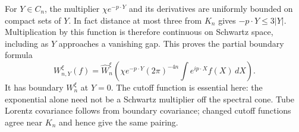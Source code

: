For $Y\in C_n$, the multiplier $\chi e^{-p\cdot Y}$ and its derivatives
are uniformly bounded on compact sets of $Y$. In fact distance at most
three from $K_n$ gives $-p\cdot Y\le3|Y|$. Multiplication by this function
is therefore continuous on Schwartz space, including as $Y$ approaches
a vanishing gap. This proves the partial boundary formula
\begin{equation}
 W_{n,Y}^\xi(f)=\widehat W_n^\xi
 \left(\chi e^{-p\cdot Y}(2\pi)^{-4n}
                         \int e^{ip\cdot X}f(X)\,dX\right).
 \label{ch16:partial-boundary}
\end{equation}
It has boundary $W_n^\xi$ at $Y=0$. The cutoff function is essential here: the
exponential alone need not be a Schwartz multiplier off the spectral
cone. Tube Lorentz covariance follows from boundary covariance; changed
cutoff functions agree near $K_n$ and hence give the same pairing.


